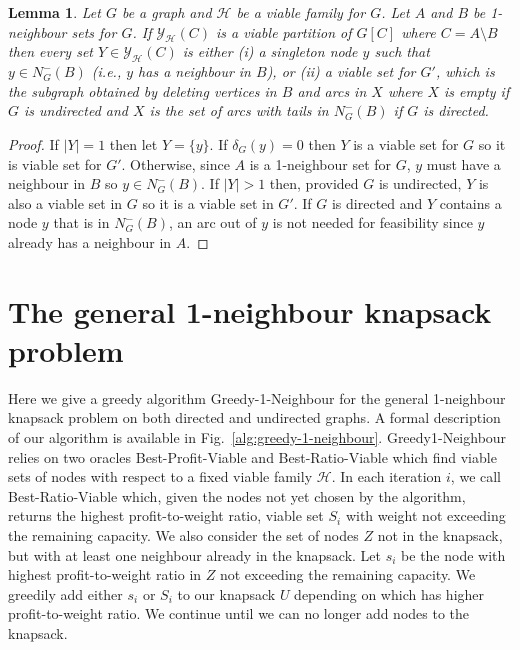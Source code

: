 \documentclass[12pt]{article}
\newtheorem{lemma}[theorem]{Lemma}
\begin{document}
\begin{lemma} \label{lemma:viable-correct} Let $G$ be a graph and
$\mathcal{H}$ be a viable family for $G$.  Let $A$ and $B$ be
1-neighbour sets for $G$.  If $\mathcal{Y}_{\mathcal{H}}(C)$ is a
viable partition of $G[C]$ where $C=A \setminus B$ then every set $Y
\in \mathcal{Y}_{\mathcal{H}}(C)$ is either (i) a singleton node $y$
such that $y \in N^{-}_{G}(B)$ (i.e., $y$ has a neighbour in $B$),
or (ii) a viable set for $G'$, which is the subgraph obtained by deleting
vertices in $B$ and arcs in $X$ where $X$ is empty if $G$ is
undirected and $X$ is the set of arcs with tails in $N^{-}_{G}(B)$
if $G$ is directed. 





\end{lemma}

\begin{proof}
If $|Y|=1$ then let $Y=\{y\}$.  If $\delta_{G}(y)=0$ then $Y$ is a
viable set for $G$ so it is viable set for $G'$. Otherwise, since
$A$ is a 1-neighbour set for $G$, $y$ must have a neighbour in $B$
so $y \in N^{-}_{G}(B)$.  If $|Y| >1$ then, provided $G$ is
undirected, $Y$ is also a viable set in $G$ so it is a viable set
in $G'$.  If $G$ is directed and $Y$ contains a node $y$ that is in
$N^{-}_{G}(B)$, an arc out of $y$ is not needed for feasibility
since $y$ already has a neighbour in $A$.

\end{proof}



\section{The general 1-neighbour knapsack problem} \label{sec:g1n}


Here we give a greedy algorithm {\sc Greedy-1-Neighbour} for the general 1-neighbour knapsack problem on both directed and undirected graphs.  A formal description of our algorithm is available in Fig.~\ref{alg:greedy-1-neighbour}.  {\sc Greedy1-Neighbour} relies on two oracles {\sc Best-Profit-Viable} and {\sc Best-Ratio-Viable} which find viable sets of nodes with respect to a fixed viable family $\mathcal{H}$.  In each iteration $i$, we call {\sc Best-Ratio-Viable} which, given the nodes not yet chosen by the algorithm, returns the highest profit-to-weight ratio, viable set $S_{i}$ with weight not exceeding the remaining capacity.  We also consider the set of nodes $Z$ not in the knapsack, but with at least one neighbour already in the knapsack.  Let $s_{i}$ be the node with highest profit-to-weight ratio in $Z$ not exceeding the remaining capacity.  We greedily add either $s_{i}$ or $S_{i}$ to our knapsack $U$ depending on which has higher profit-to-weight ratio. We continue until we can no longer add nodes to the knapsack.
\end{document}
